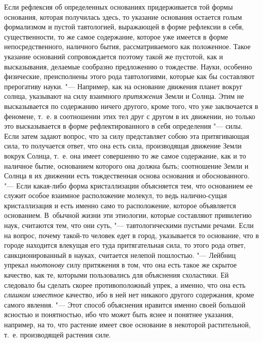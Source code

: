 Если рефлексия об определенных основаниях придерживается той формы
основания, которая получилась здесь, то указание основания остается голым
формализмом и пустой тавтологией, выражающей в форме рефлексии в себя,
существенности, то же самое содержание, которое уже имеется в форме
непосредственного, наличного бытия, рассматриваемого как положенное. Такое
указание оснований сопровождается поэтому такой же пустотой, как и
высказывания, делаемые сообразно предложению о тождестве. Науки, особенно
физические, преисполнены этого рода тавтологиями, которые как бы составляют
прерогативу науки. "--- Например, как на основание движения планет вокруг
солнца, указывают на силу взаимного {\em притяжения}
Земли и Солнца. Этим не высказывается по содержанию ничего другого, кроме
того, что уже заключается в феномене, т.~е. в соотношении этих тел друг с
другом в их движении, но только это высказывается в форме рефлектированного
в себя определения "--- силы. Если затем задают вопрос, что за силу
представляет собою эта притягивающая сила, то получается ответ, что она
есть сила, производящая движение Земли вокрук Солнца, т.~е. она имеет
совершенно то же самое содержание, как и то наличное бытие, основанием
которого она должна быть; соотношение Земли и Солнца в их движении есть
тождественная основа основания и обоснованного. "--- Если какая-либо форма
кристаллизации объясняется тем, что основанием ее служит особое взаимное
расположение молекул, то ведь налично-сущая кристаллизация и есть именно
само то расположение, которое объявляется основанием. В~обычной жизни эти
этиологии,
которые составляют привилегию наук, считаются тем, что они суть, "---
тавтологическими пустыми речами. Если на вопрос, почему такой-то человек
едет в город, указывается то основание, что в городе находится влекущая его
туда притягательная сила, то этого рода ответ, санкционированный в науках,
считается нелепой пошлостью. "--- Лейбниц упрекал
{\em ньютонову} силу притяжения в том, что она есть
такое же скрытое качество, как те, которыми пользовались для объяснения
схоластики. Ей следовало бы сделать скорее противоположный упрек, а именно,
что она есть {\em слишком известное} качество, ибо в
ней нет никакого другого содержания, кроме самого явления. "--- Этот способ
объяснения нравится именно своей большой ясностью и понятностью, ибо что
может быть яснее и понятнее указания, например, на то, что растение имеет
свое основание в некоторой растительной, т.~е. производящей растения силе.
